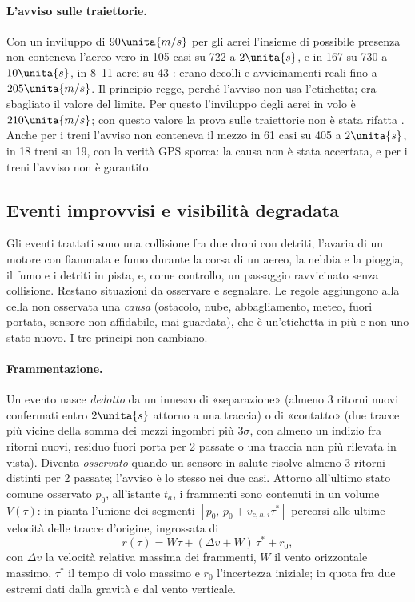 \paragraph{L'avviso sulle traiettorie.} Con un inviluppo di $90\unita{m/s}$ per gli aerei l'insieme di possibile presenza non conteneva l'aereo vero in 105 casi su 722 a $2\unita{s}$, e in 167 su 730 a $10\unita{s}$, in 8--11 aerei su 43 : erano decolli e avvicinamenti reali fino a $205\unita{m/s}$. Il principio regge, perché l'avviso non usa l'etichetta; era sbagliato il valore del limite. Per questo l'inviluppo degli aerei in volo è $210\unita{m/s}$; con questo valore la prova sulle traiettorie non è stata rifatta . Anche per i treni l'avviso non conteneva il mezzo in 61 casi su 405 a $2\unita{s}$, in 18 treni su 19, con la verità GPS sporca: la causa non è stata accertata, e per i treni l'avviso non è garantito.

\subsection{Eventi improvvisi e visibilità degradata}\label{sec:lp-eventi}

Gli eventi trattati sono una collisione fra due droni con detriti, l'avaria di un motore con fiammata e fumo durante la corsa di un aereo, la nebbia e la pioggia, il fumo e i detriti in pista, e, come controllo, un passaggio ravvicinato senza collisione. Restano situazioni da osservare e segnalare. Le regole aggiungono alla cella non osservata una \emph{causa} (ostacolo, nube, abbagliamento, meteo, fuori portata, sensore non affidabile, mai guardata), che è un'etichetta in più e non uno stato nuovo. I tre principi non cambiano.

\paragraph{Frammentazione.} Un evento nasce \emph{dedotto} da un innesco di «separazione» (almeno 3 ritorni nuovi confermati entro $2\unita{s}$ attorno a una traccia) o di «contatto» (due tracce più vicine della somma dei mezzi ingombri più $3\sigma$, con almeno un indizio fra ritorni nuovi, residuo fuori porta per 2 passate o una traccia non più rilevata in vista). Diventa \emph{osservato} quando un sensore in salute risolve almeno 3 ritorni distinti per 2 passate; l'avviso è lo stesso nei due casi. Attorno all'ultimo stato comune osservato $p_0$, all'istante $t_a$, i frammenti sono contenuti in un volume $V(\tau)$: in pianta l'unione dei segmenti $[p_0,\,p_0+v_{c,h,i}\tau^*]$ percorsi alle ultime velocità delle tracce d'origine, ingrossata di
\[
r(\tau)=W\tau+(\Delta v+W)\,\tau^*+r_0 ,
\]
con $\Delta v$ la velocità relativa massima dei frammenti, $W$ il vento orizzontale massimo, $\tau^*$ il tempo di volo massimo e $r_0$ l'incertezza iniziale; in quota fra due estremi dati dalla gravità e dal vento verticale.

